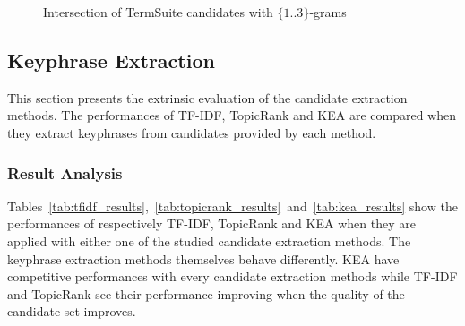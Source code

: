 \begin{figure*}
        \caption{Intersection of TermSuite candidates with $\{1..3\}$-grams
                 \label{fig:candidate_intersections}}
      \end{figure*}

  \subsection{Keyphrase Extraction}
  \label{subsec:keyphrase_extraction}
    This section presents the extrinsic evaluation of the candidate extraction
    methods. The performances of TF-IDF, TopicRank and KEA are compared when
    they extract keyphrases from candidates provided by each method.

    \subsubsection{Result Analysis}
    \label{subsubsec:candidate_extraction_result_analysis}
      Tables~\ref{tab:tfidf_results},~\ref{tab:topicrank_results}~and~\ref{tab:kea_results}
      show the performances of respectively TF-IDF, TopicRank and KEA when
      they are applied with either one of the studied candidate extraction
      methods. The keyphrase extraction methods themselves behave differently.
      KEA have competitive performances with every candidate extraction methods
      while TF-IDF and TopicRank see their performance improving when the
      quality of the candidate set improves.

